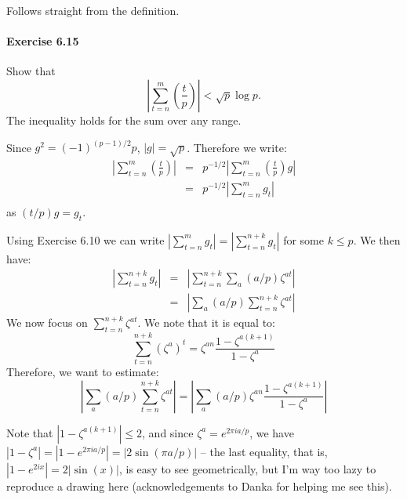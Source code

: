 \documentclass[notitlepage]{article}
\theoremstyle{definition}
\newcommand{\Jacobi}[2]{\left(\frac{#1}{#2}\right)}
\begin{document}
Follows straight from the definition.

\paragraph{Exercise 6.15}
Show that
\begin{equation}
  \left|\sum_{t = n}^m \Jacobi{t}{p}\right| < \sqrt{p}\log p.
\end{equation}
The inequality holds for the sum over any range.

Since $g^2 = (-1)^{(p-1)/2} p$, $|g| = \sqrt{p}$. Therefore we write:
\begin{eqnarray}
  \left|\sum_{t = n}^m \Jacobi{t}{p}\right|
  &=& p^{-1/2} \left|\sum_{t = n}^m \Jacobi{t}{p} g\right| \\
  &=& p^{-1/2} \left|\sum_{t = n}^m g_t \right| \\
\end{eqnarray}
as $(t/p) g = g_t$.

Using Exercise 6.10 we can write
$\left|\sum_{t = n}^m g_t \right| = \left|\sum_{t = n}^{n+k} g_t
\right|$ for some $k \leq p$.  We then have:
\begin{eqnarray}
  \left|\sum_{t = n}^{n+k} g_t \right|
  &=& \left|\sum_{t = n}^{n+k} \sum_a (a/p) \zeta^{at} \right| \\
  &=& \left|\sum_a (a/p)\sum_{t = n}^{n+k} \zeta^{at} \right|
\end{eqnarray}
We now focus on $\sum_{t = n}^{n+k} \zeta^{at}$. We note that it is equal to:
\begin{equation}
  \sum_{t = n}^{n+k} (\zeta^a)^t = \zeta^{an} \frac{1 - \zeta^{a(k+1)}}{1-\zeta^a}
\end{equation}
Therefore, we want to estimate:
\begin{equation}
  \left|\sum_a (a/p)\sum_{t = n}^{n+k} \zeta^{at} \right| = \left|\sum_a(a/p) \zeta^{an} \frac{1 - \zeta^{a(k+1)}}{1-\zeta^a} \right|
\end{equation}

Note that $|1 - \zeta^{a(k+1)}| \leq 2$, and since $\zeta^a = e^{2 \pi
  i a/p}$, we have $|1 - \zeta^a| = |1-e^{2 \pi i a/p}| = |2 \sin(\pi
a/p)|$ -- the last equality, that is, $|1-e^{2 i x}| = 2|\sin(x)|$,
is easy to see geometrically, but I'm way too lazy to reproduce a
drawing here (acknowledgements to Danka for helping me see this).
\end{document}
